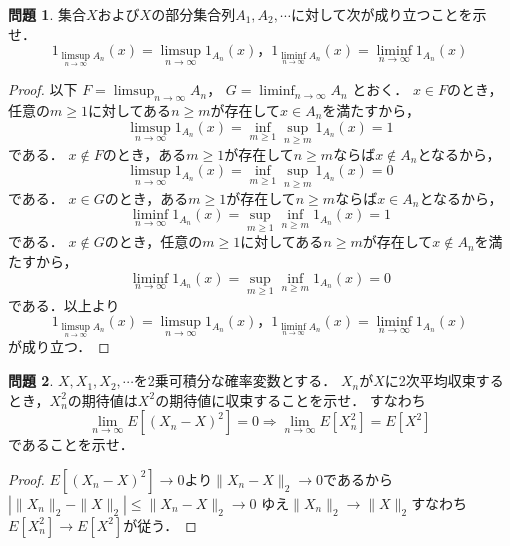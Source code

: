 \documentclass{jsarticle}
\theoremstyle{definition}
\newtheorem{qst}{問題}
\begin{document}
\begin{qst}
集合$X$および$X$の部分集合列$A_1,A_2,\cdots$に対して次が成り立つことを示せ．
\[ 1_{\limsup_{n\to\infty}A_n}(x)=\limsup_{n\to\infty}1_{A_n}(x)，
1_{\liminf_{n\to\infty}A_n}(x)=\liminf_{n\to\infty}1_{A_n}(x) \]
\end{qst}
\begin{proof}
以下
$F=\displaystyle\limsup_{n\to\infty}A_n$，
$G=\displaystyle\liminf_{n\to\infty}A_n$
とおく．
$x\in F$のとき，任意の$m\geq1$に対してある$n\geq m$が存在して$x\in A_n$を満たすから，
\[ \limsup_{n\to\infty}1_{A_n}(x)=\inf_{m\geq1}\sup_{n\geq m}1_{A_n}(x)=1 \]
である．
$x\notin F$のとき，ある$m\geq1$が存在して$n\geq m$ならば$x\notin A_n$となるから，
\[ \limsup_{n\to\infty}1_{A_n}(x)=\inf_{m\geq1}\sup_{n\geq m}1_{A_n}(x)=0 \]
である．
$x\in G$のとき，ある$m\geq1$が存在して$n\geq m$ならば$x\in A_n$となるから，
\[ \liminf_{n\to\infty}1_{A_n}(x)=\sup_{m\geq1}\inf_{n\geq m}1_{A_n}(x)=1 \]
である．
$x\notin G$のとき，任意の$m\geq1$に対してある$n\geq m$が存在して$x\notin A_n$を満たすから，
\[ \liminf_{n\to\infty}1_{A_n}(x)=\sup_{m\geq1}\inf_{n\geq m}1_{A_n}(x)=0 \]
である．以上より
\[ 1_{\limsup_{n\to\infty}A_n}(x)=\limsup_{n\to\infty}1_{A_n}(x)，
1_{\liminf_{n\to\infty}A_n}(x)=\liminf_{n\to\infty}1_{A_n}(x) \]
が成り立つ．
\end{proof}

\begin{qst}
$X,X_1,X_2,\cdots$を2乗可積分な確率変数とする．
$X_n$が$X$に2次平均収束するとき，$X_n^2$の期待値は$X^2$の期待値に収束することを示せ．
すなわち
\[ \lim_{n\to\infty}E[(X_n-X)^2]=0\Rightarrow\lim_{n\to\infty}E[X_n^2]=E[X^2] \]
であることを示せ．
\end{qst}
\begin{proof}
$E[(X_n-X)^2]\to0$より$\|X_n-X\|_2\to0$であるから
$|\|X_n\|_2-\|X\|_2|\leq\|X_n-X\|_2\to0$
ゆえ$\|X_n\|_2\to\|X\|_2$すなわち$E[X_n^2]\to E[X^2]$が従う．
\end{proof}
\end{document}
